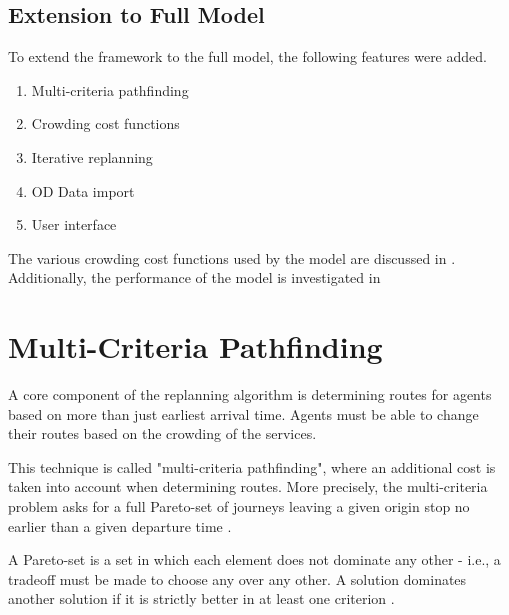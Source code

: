 
\subsection{Extension to Full Model}
To extend the framework to the full model, the following features were added.
\begin{SingleSpacing}
    \begin{enumerate}
        \item Multi-criteria pathfinding 
        \item Crowding cost functions 
        \item Iterative replanning
        \item OD Data import
        \item User interface
    \end{enumerate}
\end{SingleSpacing}

The various crowding cost functions used by the model are discussed in .
Additionally, the performance of the model is investigated in 

\section{Multi-Criteria Pathfinding}
A core component of the replanning algorithm is determining routes for agents based on more than just earliest arrival time. Agents must be able to change their routes based on the crowding of the services. 

This technique is called "multi-criteria pathfinding", where an additional cost is taken into account when determining routes. More precisely, the multi-criteria problem asks for a full Pareto-set of journeys leaving a given origin stop no earlier than a given departure time \cite{dellingRoundBasedPublicTransit2012}. 

A Pareto-set is a set in which each element does not dominate any other - i.e., a tradeoff must be made to choose any over any other. A solution dominates another solution if it is strictly better in at least one criterion \cite{bergerAcceleratingTimeDependentMultiCriteria2009}.

